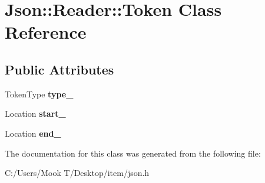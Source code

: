 \hypertarget{class_json_1_1_reader_1_1_token}{}\section{Json\+:\+:Reader\+:\+:Token Class Reference}
\label{class_json_1_1_reader_1_1_token}
\subsection*{Public Attributes}
\begin{DoxyCompactItemize}
\item 
\hypertarget{class_json_1_1_reader_1_1_token_aa0f06d0105ec3d8cb42427c66b991bad}{}Token\+Type {\bfseries type\+\_\+}\label{class_json_1_1_reader_1_1_token_aa0f06d0105ec3d8cb42427c66b991bad}

\item 
\hypertarget{class_json_1_1_reader_1_1_token_aff87d677b9ac4b52542a00b0d6673249}{}Location {\bfseries start\+\_\+}\label{class_json_1_1_reader_1_1_token_aff87d677b9ac4b52542a00b0d6673249}

\item 
\hypertarget{class_json_1_1_reader_1_1_token_a7d3bc0fa40097f435d184be4b1fd5ae1}{}Location {\bfseries end\+\_\+}\label{class_json_1_1_reader_1_1_token_a7d3bc0fa40097f435d184be4b1fd5ae1}

\end{DoxyCompactItemize}


The documentation for this class was generated from the following file\+:\begin{DoxyCompactItemize}
\item 
C\+:/\+Users/\+Mook T/\+Desktop/item/json.\+h\end{DoxyCompactItemize}
